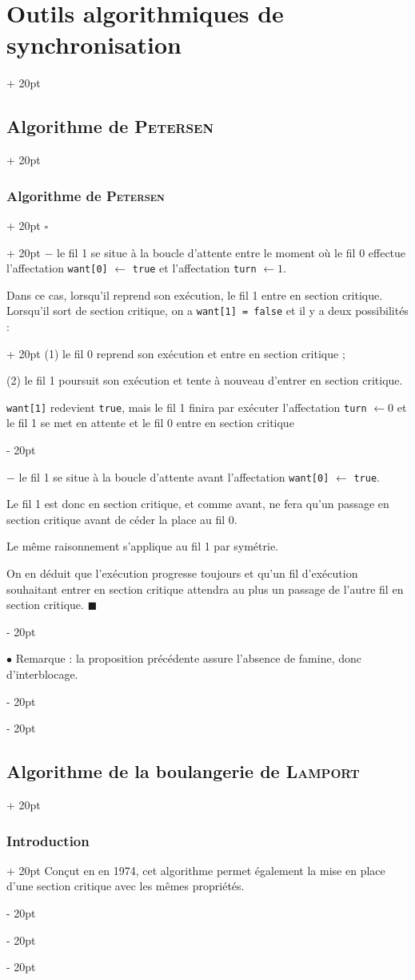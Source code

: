 \documentclass[a4paper, 12pt, twoside]{article}
\newcommand{\ind}[1][20pt]{\advance\leftskip + #1}
\newcommand{\deind}[1][20pt]{\advance\leftskip - #1}
\newenvironment{indt}[2][20pt]{#2 \par \ind[#1]}{\par \deind} %
\newenvironment{proof}[1][{}]{\begin{indt}{$\square$ #1}}{$\blacksquare$ \end{indt}}
\begin{document}
\begin{indt}{\section{Outils algorithmiques de synchronisation}}
\begin{indt}{\subsection{Algorithme de \textsc{Petersen}}}
\begin{indt}{\subsubsection{Algorithme de \textsc{Petersen}}}
\begin{proof}
                    $-$ le fil 1 se situe à la boucle d'attente entre le moment où le fil 0 effectue l'affectation \texttt{want[0]} $\leftarrow$ \texttt{true} et l'affectation \texttt{turn} $\leftarrow 1$.

                    Dans ce cas, lorsqu'il reprend son exécution, le fil 1 entre en section critique.
                    \begin{indt}{Lorsqu'il sort de section critique, on a \texttt{want[1] = false} et il y a deux possibilités :}
                        (1) le fil 0 reprend son exécution et entre en section critique ;

                        (2) le fil 1 poursuit son exécution et tente à nouveau d'entrer en section critique.

                        \texttt{want[1]} redevient \texttt{true}, mais le fil 1 finira par exécuter l'affectation \texttt{turn} $\leftarrow 0$ et le fil 1 se met en attente et le fil 0 entre en section critique
                    \end{indt}

                    $-$ le fil 1 se situe à la boucle d'attente avant l'affectation \texttt{want[0]} $\leftarrow$ \texttt{true}.

                    Le fil 1 est donc en section critique, et comme avant, ne fera qu'un passage en section critique avant de céder la place au fil 0.

                    Le même raisonnement s'applique au fil 1 par symétrie.

                    On en déduit que l'exécution progresse toujours et qu'un fil d'exécution souhaitant entrer en section critique attendra au plus un passage de l'autre fil en section critique.
                \end{proof}

                \vspace{12pt}
                
                $\bullet$ Remarque : la proposition précédente assure l'absence de famine, donc d'interblocage.
            \end{indt}
        \end{indt}

        \vspace{12pt}
        
        \begin{indt}{\subsection{Algorithme de la boulangerie de \textsc{Lamport}}}
            \begin{indt}{\subsubsection{Introduction}}
                Conçut en en 1974, cet algorithme permet également la mise en place d'une section critique avec les mêmes propriétés.


\end{indt}
\end{indt}
\end{indt}
\end{document}
